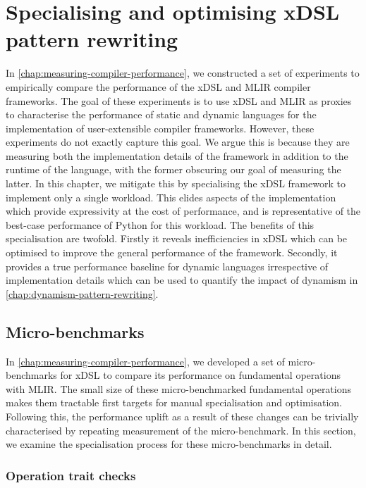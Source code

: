 \chapter{Specialising and optimising xDSL pattern rewriting}
\label{chap:specialising-optimising-pattern-rewriting}

In \autoref{chap:measuring-compiler-performance}, we constructed a set of experiments to empirically compare the performance of the xDSL and MLIR compiler frameworks.
The goal of these experiments is to use xDSL and MLIR as proxies to characterise the performance of static and dynamic languages for the implementation of user-extensible compiler frameworks.
However, these experiments do not exactly capture this goal. We argue this is because they are measuring both the implementation details of the framework in addition to the runtime of the language, with the former obscuring our goal of measuring the latter. In this chapter, we mitigate this by specialising the xDSL framework to implement only a single workload. This elides aspects of the implementation which provide expressivity at the cost of performance, and is representative of the best-case performance of Python for this workload.
The benefits of this specialisation are twofold. Firstly it reveals inefficiencies in xDSL which can be optimised to improve the general performance of the framework. Secondly, it provides a true performance baseline for dynamic languages irrespective of implementation details which can be used to quantify the impact of dynamism in \autoref{chap:dynamism-pattern-rewriting}.

\section{Micro-benchmarks}
\label{sec:specialising-ubenchmarks}

In \autoref{chap:measuring-compiler-performance}, we developed a set of micro-benchmarks for xDSL to compare its performance on fundamental operations with MLIR.
The small size of these micro-benchmarked fundamental operations makes them tractable first targets for manual specialisation and optimisation. Following this, the performance uplift as a result of these changes can be trivially characterised by repeating measurement of the micro-benchmark.
In this section, we examine the specialisation process for these micro-benchmarks in detail. %

\subsection{Operation trait checks}
\label{ssec:specialising-ubenchmarks-trait}

